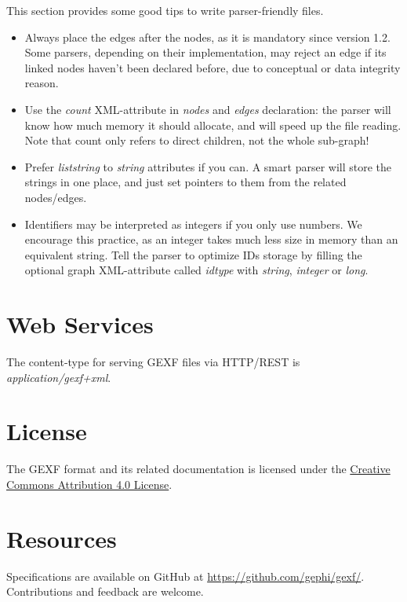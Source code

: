 \documentclass[a4paper,10pt]{article}
\begin{document}
This section provides some good tips to write parser-friendly files.
\begin{itemize}
 \item Always place the edges after the nodes, as it is mandatory since version 1.2. Some parsers, depending on their implementation, may reject an edge if its linked nodes haven't been declared before, due to conceptual or data integrity reason.
 \item Use the \textit{count} XML-attribute in \textit{nodes} and \textit{edges} declaration: the parser will know how much memory it should allocate, and will speed up the file reading. Note that count only refers to direct children, not the whole sub-graph!
 \item Prefer \textit{liststring} to \textit{string} attributes if you can. A smart parser will store the strings in one place, and just set pointers to them from the related nodes/edges.
 \item Identifiers may be interpreted as integers if you only use numbers. We encourage this practice, as an integer takes much less size in memory than an equivalent string. Tell the parser to optimize IDs storage by filling the optional graph XML-attribute called \textit{idtype} with \textit{string}, \textit{integer} or \textit{long}.
\end{itemize}

\section{Web Services} \label{ws}

The content-type for serving GEXF files via HTTP/REST is \textit{application/gexf+xml}.

\section{License} \label{license}

The GEXF format and its related documentation is licensed under the \href{https://creativecommons.org/licenses/by/4.0/}{Creative Commons Attribution 4.0 License}.

\section{Resources} \label{resources}

Specifications are available on GitHub at \href{https://github.com/gephi/gexf/}{https://github.com/gephi/gexf/}. Contributions and feedback are welcome.
\end{document}
